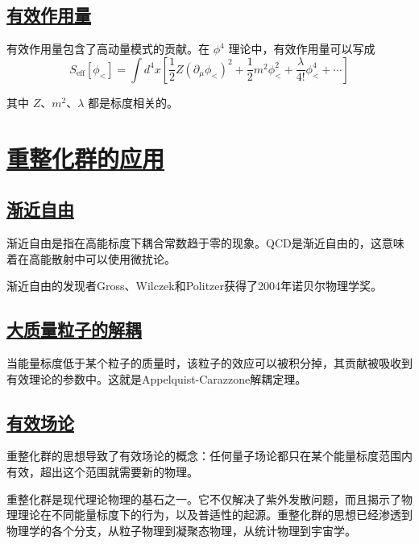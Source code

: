 \subsection{\protect\hyperlink{:}{有效作用量}}

有效作用量包含了高动量模式的贡献。在 $\phi^4$ 理论中，有效作用量可以写成
\begin{equation}
    S_{\text{eff}}[\phi_<] = \int d^4x \left[\frac{1}{2}Z(\partial_\mu\phi_<)^2 + \frac{1}{2}m^2\phi_<^2 + \frac{\lambda}{4!}\phi_<^4 + \cdots\right]
\end{equation}

其中 $Z$、$m^2$、$\lambda$ 都是标度相关的。

\section{\protect\hyperlink{:}{重整化群的应用}}

\subsection{\protect\hyperlink{:}{渐近自由}}

渐近自由是指在高能标度下耦合常数趋于零的现象。QCD是渐近自由的，这意味着在高能散射中可以使用微扰论。

渐近自由的发现者Gross、Wilczek和Politzer获得了2004年诺贝尔物理学奖。

\subsection{\protect\hyperlink{:}{大质量粒子的解耦}}

当能量标度低于某个粒子的质量时，该粒子的效应可以被积分掉，其贡献被吸收到有效理论的参数中。这就是Appelquist-Carazzone解耦定理。

\subsection{\protect\hyperlink{:}{有效场论}}

重整化群的思想导致了有效场论的概念：任何量子场论都只在某个能量标度范围内有效，超出这个范围就需要新的物理。

\begin{remark}
    重整化群是现代理论物理的基石之一。它不仅解决了紫外发散问题，而且揭示了物理理论在不同能量标度下的行为，以及普适性的起源。重整化群的思想已经渗透到物理学的各个分支，从粒子物理到凝聚态物理，从统计物理到宇宙学。
\end{remark}

